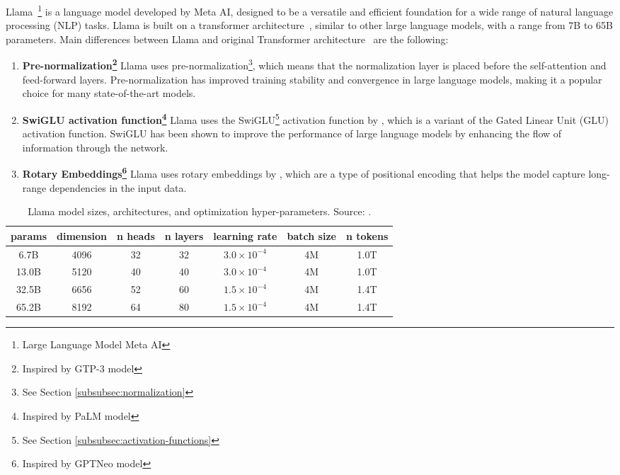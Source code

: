 Llama~\footnote{Large Language Model Meta AI} is a language model developed by Meta AI, designed to be a versatile and efficient foundation for a wide range of natural language processing (NLP) tasks.
Llama is built on a transformer architecture~\cite{vaswani2023attention}, similar to other large language models, with a range from 7B to 65B parameters.
Main differences between Llama and original Transformer architecture~\cite{vaswani2023attention} are the following:
\begin{enumerate}
	\item \textbf{Pre-normalization\footnote{Inspired by GTP-3 model}} {Llama uses pre-normalization\footnote{See Section \ref{subsubsec:normalization}}, which means that the normalization layer is placed before the self-attention and feed-forward layers.
		      Pre-normalization has improved training stability and convergence in large language models, making it a popular choice for many state-of-the-art models.
	      }
	\item \textbf{SwiGLU activation function\footnote{Inspired by PaLM model}} {Llama uses the SwiGLU\footnote{See Section \ref{subsubsec:activation-functions}} activation function by \textcite{shazeer2020glu}, which is a variant of the Gated Linear Unit (GLU) activation function.
		      SwiGLU has been shown to improve the performance of large language models by enhancing the flow of information through the network.
	      }
	\item \textbf{Rotary Embeddings\footnote{Inspired by GPTNeo model}} {Llama uses rotary embeddings by \textcite{su2021roformer}, which are a type of positional encoding that helps the model capture long-range dependencies in the input data.
	      }
\end{enumerate}

\begin{table}[ht]
	\centering
	\begin{tabular}{@{}ccccccc@{}}
		\toprule
		params & dimension & n heads & n layers & learning rate          & batch size & n tokens \\
		\midrule
		6.7B   & 4096      & 32      & 32       & \(3.0 \times 10^{-4}\) & 4M         & 1.0T     \\
		13.0B  & 5120      & 40      & 40       & \(3.0 \times 10^{-4}\) & 4M         & 1.0T     \\
		32.5B  & 6656      & 52      & 60       & \(1.5 \times 10^{-4}\) & 4M         & 1.4T     \\
		65.2B  & 8192      & 64      & 80       & \(1.5 \times 10^{-4}\) & 4M         & 1.4T     \\
		\bottomrule
	\end{tabular}
	\caption{Llama model sizes, architectures, and optimization hyper-parameters. Source: \textcite{touvron2023llama}.}
	\label{tab:llama-model-params}
\end{table}

